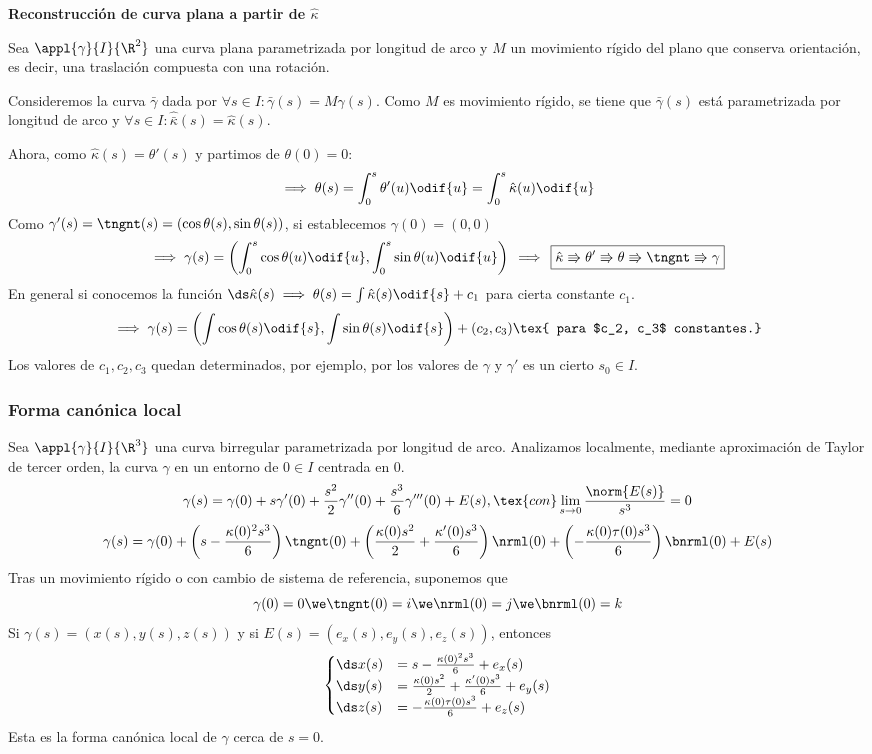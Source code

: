 \textbf{Reconstrucción de curva plana a partir de $\hat{\kappa}$}

Sea $\appl{\gamma}{I}{\R^2}$ una curva plana parametrizada por longitud de arco y $M$ un movimiento rígido del plano que conserva orientación, es decir, una traslación compuesta con una rotación.

Consideremos la curva $\bar{\gamma}$ dada por $\forall s \in I : \bar{\gamma}(s)=M\gamma(s)$. Como $M$ es movimiento rígido, se tiene que $\bar{\gamma}(s)$ está parametrizada por longitud de arco y $\forall s \in I : \hat{\bar{\kappa}}(s)=\hat{\kappa}(s)$.

Ahora, como $\hat{\kappa}(s)=\theta'(s)$ y partimos de $\theta(0)=0$:
\[\implies \theta(s)=\int_{0}^{s}\theta'(u)\odif{u} = \int_0^s\hat{\kappa}(u) \odif{u}\]
Como $\gamma'(s)=\tngnt(s)=(\cos{\theta(s)}, \sin{\theta(s)})$, si establecemos $\gamma(0)=(0, 0)$
\[\implies\gamma(s)=\left(\int_0^s\cos{\theta(u)} \odif{u},\int_0^s\sin{\theta(u)} \odif{u}\right) \, \implies \, \boxed{\hat{\kappa} \Rrightarrow \theta' \Rrightarrow \theta \Rrightarrow \tngnt \Rrightarrow \gamma}\]
En general si conocemos la función $\ds \hat{\kappa}(s) \implies \theta(s) = \int \hat{\kappa}(s)\odif{s} + c_1$ para cierta constante $c_1$.
\[\implies \gamma(s)=\left(\int \cos{\theta(s)} \odif{s}, \int \sin{\theta(s)}\odif{s}\right) + (c_2, c_3) \tex{ para $c_2, c_3$ constantes.}\]
Los valores de $c_1, c_2, c_3$ quedan determinados, por ejemplo, por los valores de $\gamma$ y $\gamma'$ es un cierto $s_0\in I$.

\subsubsection{Forma canónica local}

Sea $\appl{\gamma}{I}{\R^3}$ una curva birregular parametrizada por longitud de arco.
Analizamos localmente, mediante aproximación de Taylor de tercer orden, la curva $\gamma$ en un entorno de $0 \in I$ centrada en $0$.
\[\gamma(s)=\gamma(0) + s\gamma'(0) + \frac{s^2}{2} \gamma''(0) + \frac{s^3}{6}\gamma'''(0) + E(s), \tex{ con }\lim_{s\to0}\frac{\norm{E(s)}}{s^3} = 0\]
\[\gamma(s)=\gamma(0) + \left(s-\frac{\kappa(0)^2s^3}{6}\right)\tngnt(0) + \left(\frac{\kappa(0)s^2}{2} + \frac{\kappa'(0)s^3}{6}\right)\nrml(0) + \left(-\frac{\kappa(0)\tau(0)s^3}{6}\right)\bnrml(0) + E(s)\]
Tras un movimiento rígido o con cambio de sistema de referencia, suponemos que
\[\gamma(0)=0 \we \tngnt(0)=i \we \nrml(0)=j \we \bnrml(0)=k\]
Si $\gamma(s)=(x(s), y(s), z(s))$ y si $E(s)=(e_x(s), e_y(s), e_z(s))$, entonces
\[\begin{cases}
		\ds x(s) & = s - \frac{\kappa(0)^2s^3}{6} + e_x(s)                     \\
		\ds y(s) & = \frac{\kappa(0)s^2}{2} + \frac{\kappa'(0)s^3}{6} + e_y(s) \\
		\ds z(s) & = -\frac{\kappa(0)\tau(0)s^3}{6} + e_z(s)
	\end{cases}\]
Esta es la forma canónica local de $\gamma$ cerca de $s=0$.

